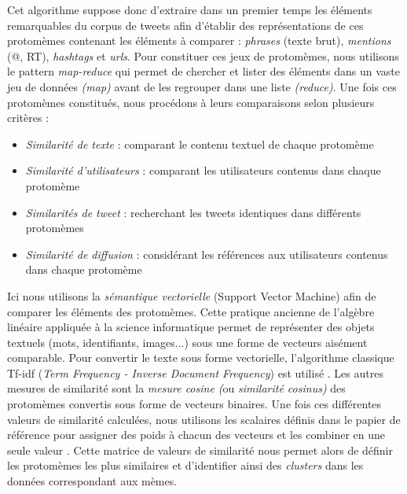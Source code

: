 Cet algorithme suppose donc d{\textquoteright}extraire dans un premier temps les éléments remarquables du corpus de tweets afin d{\textquoteright}établir des représentations de ces protomèmes contenant les éléments à comparer : \textit{phrases} (texte brut), \textit{mentions }(@, RT), \textit{hashtags} et \textit{urls}. Pour constituer ces jeux de protomèmes, nous utilisons le pattern \textit{map-reduce} qui permet de chercher et lister des éléments dans un vaste jeu de données \textit{(map)} avant de les regrouper dans une liste \textit{(reduce)}. Une fois ces protomèmes constitués, nous procédons à leurs comparaisons selon plusieurs critères :

\begin{itemize}
    \item \textit{Similarité de texte} : comparant le contenu textuel de chaque protomème 
    \item \textit{Similarité d{\textquoteright}utilisateurs} : comparant les utilisateurs contenus dans chaque protomème
    \item \textit{Similarités de tweet} : recherchant les tweets identiques dans différents protomèmes
    \item \textit{Similarité de diffusion} : considérant les références aux utilisateurs contenus dans chaque protomème
\end{itemize}

Ici nous utilisons la \textit{sémantique vectorielle} (Support Vector Machine) afin de comparer les éléments des protomèmes. Cette pratique ancienne de l{\textquoteright}algèbre linéaire appliquée à la science informatique \citep{Salton1975} permet de représenter des objets textuels (mots, identifiants, images...) sous une forme de vecteurs aisément comparable. Pour convertir le texte sous forme vectorielle, l{\textquoteright}algorithme classique Tf-idf (\textit{Term Frequency - Inverse Document Frequency}) est utilisé \citep{Soucy2005}. Les autres mesures de similarité sont la \textit{mesure cosine (}ou \textit{similarité cosinus) }des protomèmes convertis sous forme de vecteurs binaires. Une fois ces différentes valeurs de similarité calculées, nous utilisons les scalaires définis dans le papier de référence pour assigner des poids à chacun des vecteurs et les combiner en une seule valeur \citep{Ferrara2013}. Cette matrice de valeurs de similarité nous permet alors de définir les protomèmes les plus similaires et d{\textquoteright}identifier ainsi des \textit{clusters }dans les données correspondant aux mèmes.

